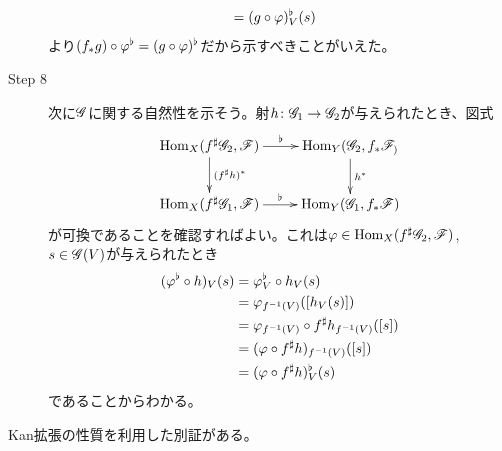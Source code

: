 \begin{description}
\begin{align*}
    &= (g \circ {\varphi})^{\flat}_V (s)
  \end{align*}
  より$(f_* g) \circ {\varphi}^{\flat} = (g \circ {\varphi})^{\flat}$だから示すべきことがいえた。
    \item[Step 8] 次に$\mathscr{G}$に関する自然性を示そう。射$h \colon \mathscr{G}_1 \to \mathscr{G}_2$が与えられたとき、図式
    \[
    \xymatrix{
    \Hom_X(f\sh\scrg_2, \scrf) \ar[r]^-{\flat} \ar[d]^-{(f\sh h)^*} & \Hom_Y(\scrg_2,f_*\scrf_) \ar[d]^-{h^*} \\
    \Hom_X(f\sh\scrg_1, \scrf) \ar[r]^-{\flat} & \Hom_Y(\scrg_1,f_*\scrf)
    }
    \]
    が可換であることを確認すればよい。これは${\varphi} \in \operatorname{Hom}_X(f^{\sharp}\mathscr{G}_2, \mathscr{F})$, $s \in \mathscr{G}(V)$が与えられたとき
    \begin{align*}
      ({\varphi}^{\flat} \circ h)_V (s) &= {\varphi}^{\flat}_V \circ h_V (s) \\
      &= {\varphi}_{f^{-1}(V)} ( [h_V(s)]) \\
      &= {\varphi}_{f^{-1}(V)} \circ f^{\sharp} h_{f^{-1}(V)} ([s]) \\
      &= ({\varphi} \circ f^{\sharp} h)_{f^{-1}(V)} ([s]) \\
      &= ({\varphi} \circ f^{\sharp} h )_V^{\flat} (s)
    \end{align*}
    であることからわかる。
\end{description}

\begin{ano}
  Kan拡張の性質を利用した別証がある。
\end{ano}


